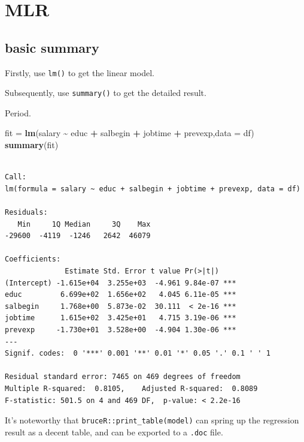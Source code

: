 \documentclass[
]{ctexart}
\newenvironment{Shaded}{\begin{snugshade}}{\end{snugshade}}
\newcommand{\AttributeTok}[1]{\textcolor[rgb]{0.13,0.29,0.53}{#1}}
\newcommand{\FunctionTok}[1]{\textcolor[rgb]{0.13,0.29,0.53}{\textbf{#1}}}
\newcommand{\NormalTok}[1]{#1}
\newcommand{\OtherTok}[1]{\textcolor[rgb]{0.56,0.35,0.01}{#1}}
\newcommand{\SpecialCharTok}[1]{\textcolor[rgb]{0.81,0.36,0.00}{\textbf{#1}}}
\begin{document}
\hypertarget{mlr}{%
\section{MLR}\label{mlr}}

\hypertarget{basic-summary}{%
\subsection{basic summary}\label{basic-summary}}

Firstly, use \texttt{lm()} to get the linear model.

Subsequently, use \texttt{summary()} to get the detailed result.

Period.

\begin{Shaded}
\begin{Highlighting}[]
\NormalTok{fit }\OtherTok{=} \FunctionTok{lm}\NormalTok{(salary }\SpecialCharTok{\textasciitilde{}}\NormalTok{ educ }\SpecialCharTok{+}\NormalTok{ salbegin }\SpecialCharTok{+}\NormalTok{ jobtime }\SpecialCharTok{+}\NormalTok{ prevexp,}\AttributeTok{data =}\NormalTok{ df)}
\FunctionTok{summary}\NormalTok{(fit)}
\end{Highlighting}
\end{Shaded}

\begin{verbatim}

Call:
lm(formula = salary ~ educ + salbegin + jobtime + prevexp, data = df)

Residuals:
   Min     1Q Median     3Q    Max 
-29600  -4119  -1246   2642  46079 

Coefficients:
              Estimate Std. Error t value Pr(>|t|)    
(Intercept) -1.615e+04  3.255e+03  -4.961 9.84e-07 ***
educ         6.699e+02  1.656e+02   4.045 6.11e-05 ***
salbegin     1.768e+00  5.873e-02  30.111  < 2e-16 ***
jobtime      1.615e+02  3.425e+01   4.715 3.19e-06 ***
prevexp     -1.730e+01  3.528e+00  -4.904 1.30e-06 ***
---
Signif. codes:  0 '***' 0.001 '**' 0.01 '*' 0.05 '.' 0.1 ' ' 1

Residual standard error: 7465 on 469 degrees of freedom
Multiple R-squared:  0.8105,    Adjusted R-squared:  0.8089 
F-statistic: 501.5 on 4 and 469 DF,  p-value: < 2.2e-16
\end{verbatim}

It's noteworthy that \texttt{bruceR::print\_table(model)} can spring up
the regression result as a decent table, and can be exported to a
\texttt{.doc} file.
\end{document}
